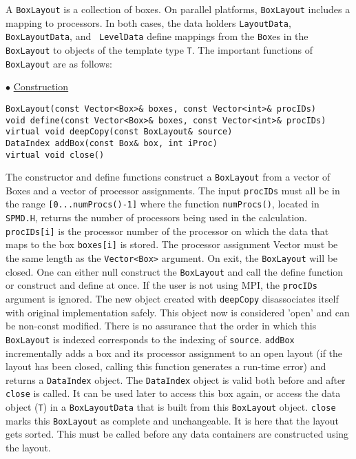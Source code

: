 A {\tt BoxLayout} is a collection of boxes. On parallel platforms,
{\tt BoxLayout} includes a mapping to processors. In both cases,
the data holders {\tt LayoutData}, {\tt BoxLayoutData}, and {\tt
LevelData} define mappings from the {\tt Box}es in the {\tt BoxLayout} 
to objects of the template type {\tt T}. 
The important functions of {\tt BoxLayout} are as follows:
\begin{trivlist}
\item $\bullet$ \underline{Construction}
\begin{verbatim} 
BoxLayout(const Vector<Box>& boxes, const Vector<int>& procIDs)
void define(const Vector<Box>& boxes, const Vector<int>& procIDs)
virtual void deepCopy(const BoxLayout& source)
DataIndex addBox(const Box& box, int iProc)
virtual void close()
\end{verbatim}
The constructor and define functions 
construct a {\tt BoxLayout} from a vector of Boxes and a vector of
processor assignments. The input {\tt procIDs}
must all be in the range \verb/[0...numProcs()-1]/ 
where the function {\tt numProcs()}, located in 
{\tt SPMD.H}, returns the number of processors being used in
the calculation.
\verb/procIDs[i]/ is the processor number of 
the processor on which the 
data that maps to the box \verb/boxes[i]/ is stored.
The processor assignment Vector
must be the same length
as the {\tt Vector<Box>} argument.
On exit, the {\tt BoxLayout} will be closed.
One can either null construct the {\tt BoxLayout} and call
the define function or construct and define at once.
If the user is not using MPI, the {\tt procIDs} argument
is ignored.
The new object created with {\tt deepCopy} 
disassociates itself with original implementation
safely.  This object now is considered 'open' and can be non-const
modified.  There is no assurance that the order in which this 
{\tt BoxLayout}
is indexed corresponds to the indexing of {\tt source}.
{\tt addBox} incrementally adds a box and its processor assignment to
an open layout (if the layout has been closed, calling
this function generates a run-time error) and returns a {\tt DataIndex}
object.
The {\tt DataIndex} object is valid both before and after
{\tt close} is called.
It can
be used later to access this box again, or access the 
data object ({\tt T})
in a \verb/BoxLayoutData/ that is built from this 
{\tt BoxLayout} object. 
{\tt close} marks this {\tt BoxLayout} as complete and unchangeable.   
It is here that the layout
gets sorted.  This must be called before any data containers
are constructed using the layout.


\end{trivlist}
